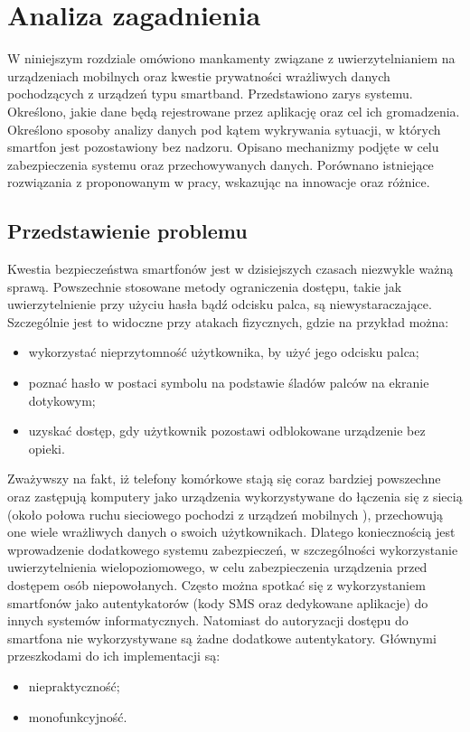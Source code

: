 \chapter{Analiza zagadnienia}
\thispagestyle{chapterBeginStyle}
\label{rozdzial1}
W niniejszym rozdziale omówiono mankamenty związane z uwierzytelnianiem na urządzeniach mobilnych oraz kwestie prywatności wrażliwych danych
pochodzących z urządzeń typu smartband. Przedstawiono zarys systemu. Określono, jakie dane będą rejestrowane
przez aplikację oraz cel ich gromadzenia. Określono sposoby analizy danych pod kątem wykrywania sytuacji, w których smartfon jest pozostawiony
bez nadzoru. Opisano mechanizmy podjęte w celu zabezpieczenia systemu oraz przechowywanych danych. Porównano istniejące rozwiązania z proponowanym w pracy,
wskazując na innowacje oraz różnice.

\section{Przedstawienie problemu}
Kwestia bezpieczeństwa smartfonów jest w dzisiejszych czasach niezwykle ważną sprawą. Powszechnie stosowane metody ograniczenia dostępu, takie
jak uwierzytelnienie przy użyciu hasła bądź odcisku palca, są niewystaraczające. Szczególnie jest to widoczne przy atakach fizycznych, gdzie na
przykład można:
\begin{itemize}
    \item wykorzystać nieprzytomność użytkownika, by użyć jego odcisku palca;
    \item poznać hasło w postaci symbolu na podstawie śladów palców na ekranie dotykowym;
    \item uzyskać dostęp, gdy użytkownik pozostawi odblokowane urządzenie bez opieki.
\end{itemize}

\indent Zważywszy na fakt, iż telefony komórkowe stają się coraz bardziej powszechne \cite{Smartphone-Users-W-wide} oraz zastępują komputery jako urządzenia wykorzystywane do łączenia się z
siecią (około połowa ruchu sieciowego pochodzi z urządzeń mobilnych \cite{Share-Of-Internet-Traffic-Mobile}), przechowują one wiele wrażliwych danych
o swoich użytkownikach. Dlatego koniecznością jest wprowadzenie dodatkowego systemu zabezpieczeń, w
szczególności wykorzystanie uwierzytelnienia wielopoziomowego, w celu zabezpieczenia urządzenia przed dostępem osób niepowołanych. Często można
spotkać się z wykorzystaniem smartfonów jako autentykatorów (kody SMS oraz dedykowane aplikacje) do innych systemów informatycznych.
Natomiast do autoryzacji dostępu do smartfona nie wykorzystywane są żadne dodatkowe autentykatory. Głównymi przeszkodami do ich implementacji są:
\begin{itemize}
    \item niepraktyczność;
    \item monofunkcyjność.
\end{itemize}

